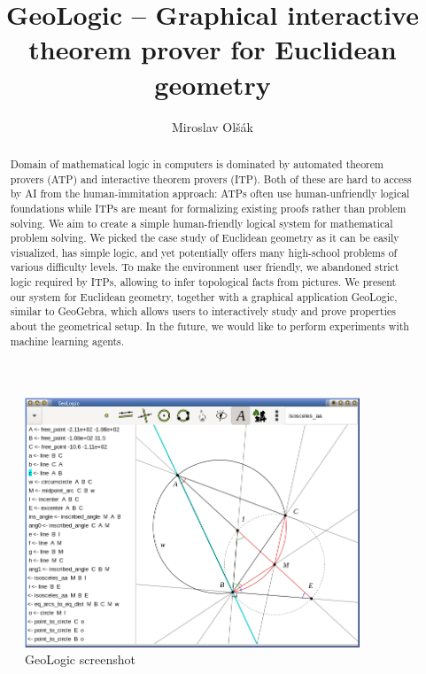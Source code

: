 \documentclass[runningheads]{llncs}
\begin{document}
\title{GeoLogic -- Graphical interactive theorem prover for Euclidean geometry}
%
%
\author{Miroslav Ol\v s\'ak}
%
%
%
\maketitle              %
%
\begin{abstract}
Domain of mathematical logic in computers is dominated by
automated theorem provers (ATP) and interactive theorem provers (ITP).
Both of these are hard to  access by AI from the human-immitation
approach: ATPs often use human-unfriendly logical foundations while ITPs
are meant for formalizing existing proofs rather than problem solving.
We aim to create a simple human-friendly logical system for mathematical
problem solving. We picked the case study of Euclidean geometry as it
can be easily visualized, has simple logic, and yet potentially offers
many high-school problems of various difficulty levels. To make the
environment user friendly, we abandoned strict logic required by ITPs,
allowing to infer topological facts from pictures. We present our system
for Euclidean geometry, together with a graphical application GeoLogic,
similar to GeoGebra, which allows users to interactively study and prove
properties about the geometrical setup. In the future, we would like to
perform experiments with machine learning agents.
\end{abstract}

\begin{figure}
  \centering
  \includegraphics[width = 10cm]{screenshot.png}%
  \caption{GeoLogic screenshot}
\end{figure}
\end{document}

